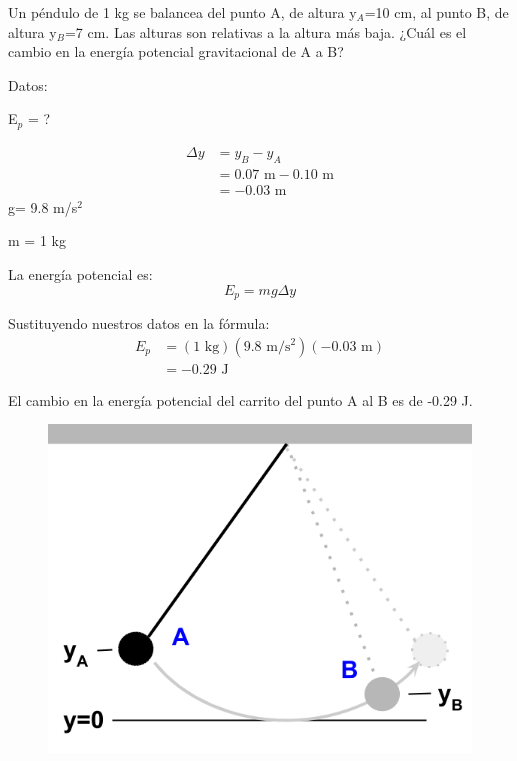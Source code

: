 Un péndulo de 1 kg se balancea del punto A, de altura y$_A$=10 cm, al punto B, de altura y$_B$=7 cm. Las alturas son relativas a la altura más baja. ¿Cuál es el cambio en la energía potencial gravitacional de A a B?

\begin{minipage}{0.68\textwidth}
    \begin{solutionbox}{5.8cm}
        \begin{multicols}{2}
            Datos:

            E$_p$ = ?

            \[
                \begin{array}{rl}
                    \Delta y & = y_B - y_A                       \\
                             & = 0.07 \text{ m} - 0.10 \text{ m} \\
                             & = -0.03 \text{ m}
                \end{array}
            \]
            g= 9.8 m/s$^2$

            m = 1 kg

            \vspace{2cm}

            La energía potencial es:
            \[E_p=mg\Delta y\]


            Sustituyendo nuestros datos en la fórmula:
            \[
                \begin{array}{rl}
                    E_p & = (1 \text{ kg})(9.8 \text{ m/s$^2$})(-0.03 \text{ m}) \\[1em]
                        & =-0.29 \text{ J }
                \end{array}
            \]

        \end{multicols}
        \begin{center}El cambio en la energía potencial del carrito del punto A al B es de -0.29 J.\end{center}
    \end{solutionbox}
\end{minipage}\hfill
\begin{minipage}{0.25\textwidth}
    \begin{figure}[H]
        \includegraphics[width=\linewidth]{../images/4a243ab80f29a94e88f7c5425b2c9bfe54cd78a6}
    \end{figure}
\end{minipage}
